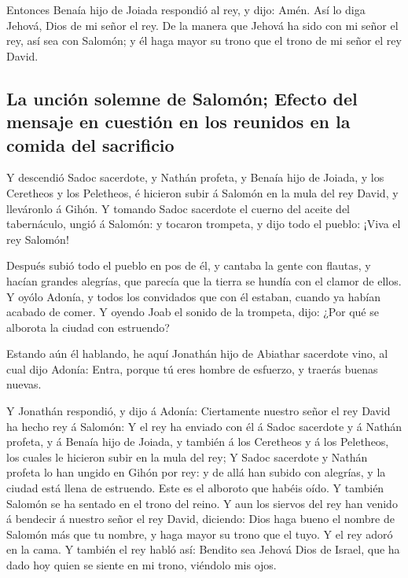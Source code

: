  Entonces Benaía hijo de Joiada respondió al rey, y dijo:
Amén. Así lo diga Jehová, Dios de mi señor el rey.  De la
manera que Jehová ha sido con mi señor el rey, así sea con Salomón; y él
haga mayor su trono que el trono de mi señor el rey David.

\hypertarget{la-unciuxf3n-solemne-de-salomuxf3n-efecto-del-mensaje-en-cuestiuxf3n-en-los-reunidos-en-la-comida-del-sacrificio}{%
\subsection{La unción solemne de Salomón; Efecto del mensaje en cuestión
en los reunidos en la comida del
sacrificio}\label{la-unciuxf3n-solemne-de-salomuxf3n-efecto-del-mensaje-en-cuestiuxf3n-en-los-reunidos-en-la-comida-del-sacrificio}}

 Y descendió Sadoc sacerdote, y Nathán profeta, y Benaía
hijo de Joiada, y los Ceretheos y los Peletheos, é hicieron subir á
Salomón en la mula del rey David, y lleváronlo á Gihón. 
Y tomando Sadoc sacerdote el cuerno del aceite del tabernáculo, ungió á
Salomón: y tocaron trompeta, y dijo todo el pueblo: ¡Viva el rey
Salomón!

 Después subió todo el pueblo en pos de él, y cantaba la
gente con flautas, y hacían grandes alegrías, que parecía que la tierra
se hundía con el clamor de ellos.  Y oyólo Adonía, y
todos los convidados que con él estaban, cuando ya habían acabado de
comer. Y oyendo Joab el sonido de la trompeta, dijo: ¿Por qué se
alborota la ciudad con estruendo?

 Estando aún él hablando, he aquí Jonathán hijo de
Abiathar sacerdote vino, al cual dijo Adonía: Entra, porque tú eres
hombre de esfuerzo, y traerás buenas nuevas.

 Y Jonathán respondió, y dijo á Adonía: Ciertamente
nuestro señor el rey David ha hecho rey á Salomón:  Y el
rey ha enviado con él á Sadoc sacerdote y á Nathán profeta, y á Benaía
hijo de Joiada, y también á los Ceretheos y á los Peletheos, los cuales
le hicieron subir en la mula del rey;  Y Sadoc sacerdote
y Nathán profeta lo han ungido en Gihón por rey: y de allá han subido
con alegrías, y la ciudad está llena de estruendo. Este es el alboroto
que habéis oído.  Y también Salomón se ha sentado en el
trono del reino.  Y aun los siervos del rey han venido á
bendecir á nuestro señor el rey David, diciendo: Dios haga bueno el
nombre de Salomón más que tu nombre, y haga mayor su trono que el tuyo.
Y el rey adoró en la cama.  Y también el rey habló así:
Bendito sea Jehová Dios de Israel, que ha dado hoy quien se siente en mi
trono, viéndolo mis ojos.


